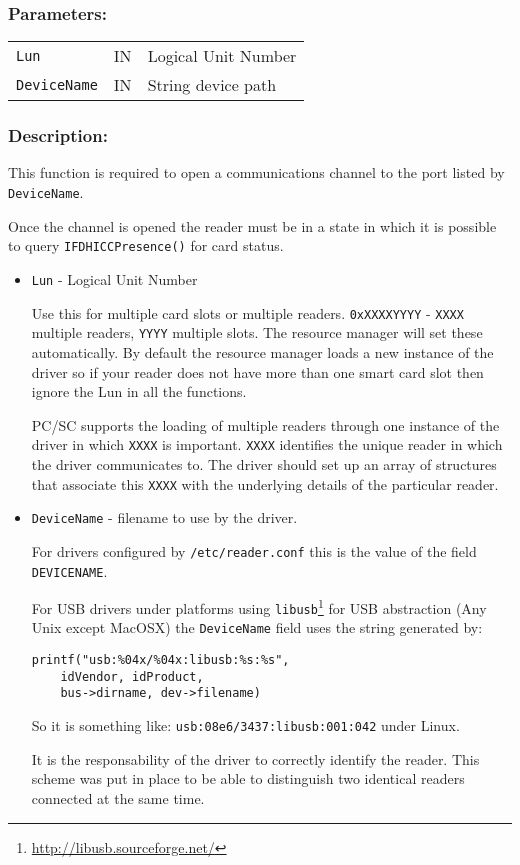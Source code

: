 \documentclass[a4paper,12pt]{article}
\newcommand{\parameters}{\subsubsection{Parameters:}}
\newcommand{\desc}{\subsubsection{Description:}}
\begin{document}
\parameters

\begin{tabular}{lll}
\texttt{Lun} & IN & Logical Unit Number \\
\texttt{DeviceName} & IN & String device path \\
\end{tabular}


\desc

This function is required to open a communications channel to the port
listed by \texttt{DeviceName}.

Once the channel is opened the reader must be in a state in which it is
possible to query \texttt{IFDHICCPresence()} for card status.

\begin{itemize}
\item \texttt{Lun} - Logical Unit Number

Use this for multiple card slots or multiple readers.
\texttt{0xXXXXYYYY} - \texttt{XXXX} multiple readers, \texttt{YYYY}
multiple slots. The resource manager will set these automatically. By
default the resource manager loads a new instance of the driver so if
your reader does not have more than one smart card slot then ignore the
Lun in all the functions.

PC/SC supports the loading of multiple readers through one instance of
the driver in which \texttt{XXXX} is important. \texttt{XXXX} identifies
the unique reader in which the driver communicates to. The driver should
set up an array of structures that associate this \texttt{XXXX} with the
underlying details of the particular reader.

\item \texttt{DeviceName} - filename to use by the driver.

For drivers configured by \texttt{/etc/reader.conf} this is the value of
the field \texttt{DEVICENAME}.

For USB drivers under platforms using
\texttt{libusb}\footnote{\url{http://libusb.sourceforge.net/}} for USB
abstraction (Any Unix except MacOSX) the \texttt{DeviceName} field uses
the string generated by:
\begin{verbatim}
printf("usb:%04x/%04x:libusb:%s:%s",
    idVendor, idProduct,
    bus->dirname, dev->filename)
\end{verbatim}

So it is something like: \texttt{usb:08e6/3437:libusb:001:042} under
Linux.

It is the responsability of the driver to correctly identify the reader.
This scheme was put in place to be able to distinguish two identical
readers connected at the same time.

\end{itemize}
\end{document}
